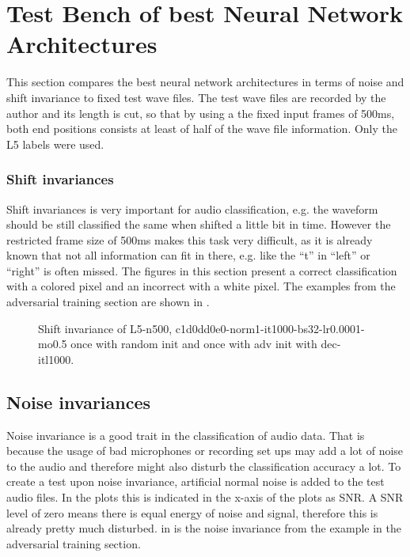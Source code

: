 
\section{Test Bench of best Neural Network Architectures}\label{sec:exp_tb}
This section compares the best neural network architectures in terms of noise and shift invariance to fixed test wave files.
The test wave files are recorded by the author and its length is cut, so that by using a the fixed input frames of 500ms, both end positions consists at least of half of the wave file information.
Only the L5 labels were used.

\subsubsection{Shift invariances}
Shift invariances is very important for audio classification, e.g. the waveform should be still classified the same when shifted a little bit in time.
However the restricted frame size of 500ms makes this task very difficult, as it is already known that not all information can fit in there, e.g. like the \enquote{t} in \enquote{left} or \enquote{right} is often missed.
The figures in this section present a correct classification with a colored pixel and an incorrect with a white pixel.
The examples from the adversarial training section are shown in .
\begin{figure}[!ht]
  \centering
  \caption{Shift invariance of L5-n500, c1d0dd0e0-norm1-it1000-bs32-lr0.0001-mo0.5 once with random init and once with adv init with dec-itl1000.}
  \label{fig:exp_tb_shift_fc3}
\end{figure}
\FloatBarrier
\noindent


\subsection{Noise invariances}
Noise invariance is a good trait in the classification of audio data.
That is because the usage of bad microphones or recording set ups may add a lot of noise to the audio and therefore might also disturb the classification accuracy a lot.
To create a test upon noise invariance, artificial normal noise is added to the test audio files.
In the plots this is indicated in the x-axis of the plots as SNR. 
A SNR level of zero means there is equal energy of noise and signal, therefore this is already pretty much disturbed.
in  is the noise invariance from the example in the adversarial training section.

